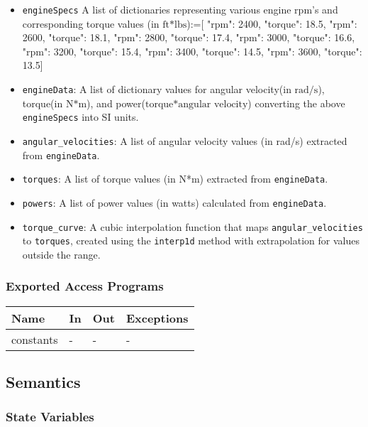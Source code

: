\documentclass[12pt, titlepage]{article}
\begin{document}
\begin{itemize}
  \item \texttt{engineSpecs} A list of dictionaries representing various engine rpm's and corresponding torque values (in $\text{ft*lbs}$):=[
    {"rpm": 2400, "torque": 18.5},
    {"rpm": 2600, "torque": 18.1},
    {"rpm": 2800, "torque": 17.4},
    {"rpm": 3000, "torque": 16.6},
    {"rpm": 3200, "torque": 15.4},
    {"rpm": 3400, "torque": 14.5},
    {"rpm": 3600, "torque": 13.5}]
  \item \texttt{engineData}: A list of dictionary values for angular velocity(in $\text{rad/s}$), torque(in $\text{N*m}$), and power($\text{torque*angular velocity}$) converting the above \texttt{engineSpecs} into SI units.
  \item \texttt{angular\_velocities}: A list of angular velocity values (in rad/s) extracted from \texttt{engineData}.
  \item \texttt{torques}: A list of torque values (in N*m) extracted from \texttt{engineData}.
  \item \texttt{powers}: A list of power values (in watts) calculated from \texttt{engineData}.
  \item \texttt{torque\_curve}: A cubic interpolation function that maps \texttt{angular\_velocities} to \texttt{torques}, created using the \texttt{interp1d} method with extrapolation for values outside the range.
  
\end{itemize}


\subsubsection{Exported Access Programs}

\begin{center}
\begin{tabular}{p{2cm} p{4cm} p{4cm} p{2cm}}
\hline
\textbf{Name} & \textbf{In} & \textbf{Out} & \textbf{Exceptions} \\
\hline
constants & - & - & - \\
\hline
\end{tabular}
\end{center}

\subsection{Semantics}

\subsubsection{State Variables}
\end{document}
